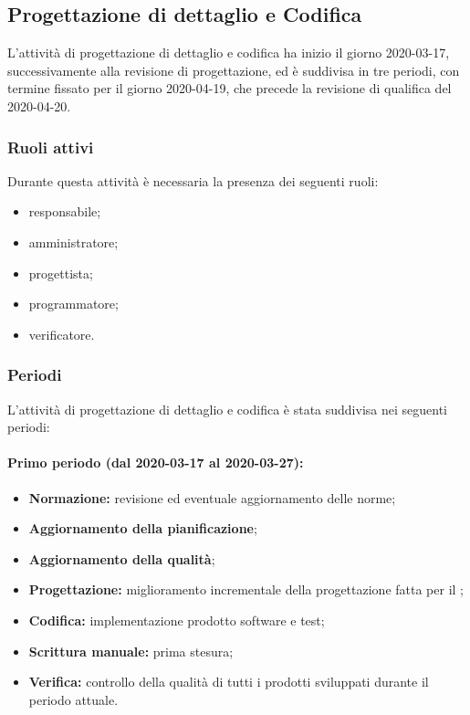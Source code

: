 		\subsection{Progettazione di dettaglio e Codifica}
			
			L'attività di progettazione di dettaglio e codifica ha inizio il giorno 2020-03-17, successivamente alla revisione di progettazione, ed è suddivisa in tre periodi, con termine fissato per il giorno 2020-04-19, che precede la revisione di qualifica del 2020-04-20.
			
			\subsubsection{Ruoli attivi}
			
				Durante questa attività è necessaria la presenza dei seguenti ruoli:
				\begin{itemize}
					\item responsabile;
					\item amministratore;
					\item progettista;
					\item programmatore;
					\item verificatore.
				\end{itemize}
			
			\subsubsection{Periodi}
			
				L'attività di progettazione di dettaglio e codifica è stata suddivisa nei seguenti periodi:
				
				\paragraph{Primo periodo (dal 2020-03-17 al 2020-03-27):}
				
					\begin{itemize}
						\item \textbf{Normazione:} revisione ed eventuale aggiornamento delle norme;
						\item \textbf{Aggiornamento della pianificazione};
						\item \textbf{Aggiornamento della qualità};
						\item \textbf{Progettazione:} miglioramento incrementale della progettazione fatta per il ;
						\item \textbf{Codifica:} implementazione prodotto software e test;
						\item \textbf{Scrittura manuale:} prima stesura;
						\item \textbf{Verifica:} controllo della qualità di tutti i prodotti sviluppati durante il periodo attuale.
					\end{itemize} 	
				
